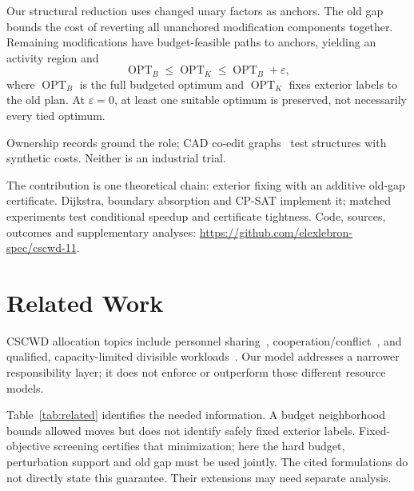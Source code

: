 \documentclass[conference]{IEEEtran}
\newcommand{\opt}{\operatorname{OPT}}
\newcommand{\eps}{\varepsilon}
\begin{document}
Our structural reduction uses changed unary factors as anchors. The old gap bounds the cost of reverting all unanchored modification components together. Remaining modifications have budget-feasible paths to anchors, yielding an activity region and
\begin{equation}
\opt_B\leq\opt_K\leq\opt_B+\eps,\label{eq:headline}
\end{equation}
where $\opt_B$ is the full budgeted optimum and $\opt_K$ fixes exterior labels to the old plan. At $\eps=0$, at least one suitable optimum is preserved, not necessarily every tied optimum.

Ownership records ground the role; CAD co-edit graphs~\cite{gopsill2019dsm,gopsill2019data} test structures with synthetic costs. Neither is an industrial trial.

The contribution is one theoretical chain: exterior fixing with an additive old-gap certificate. Dijkstra, boundary absorption and CP-SAT implement it; matched experiments test conditional speedup and certificate tightness. Code, sources, outcomes and supplementary analyses: \url{https://github.com/elexlebron-spec/cscwd-11}.

\section{Related Work}
CSCWD allocation topics include personnel sharing~\cite{zhang2025sharing}, cooperation/conflict~\cite{liu2025time}, and qualified, capacity-limited divisible workloads~\cite{hannan2026divisible}. Our model addresses a narrower responsibility layer; it does not enforce or outperform those different resource models.

Table~\ref{tab:related} identifies the needed information. A budget neighborhood bounds allowed moves but does not identify safely fixed exterior labels. Fixed-objective screening certifies that minimization; here the hard budget, perturbation support and old gap must be used jointly. The cited formulations do not directly state this guarantee. Their extensions may need separate analysis.
\end{document}
